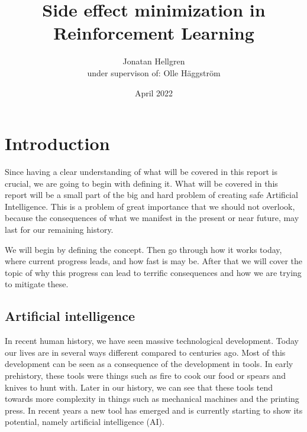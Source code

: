 \documentclass[12pt,A4]{report}
\title{Side effect minimization in Reinforcement Learning}
\author{Jonatan Hellgren\\
under supervison of: Olle Häggström}
\date{April 2022}
\theoremstyle{definition}
\begin{document}
\maketitle


\thispagestyle{empty}

\newpage
{}

\tableofcontents

\newpage
{}

% 

\chapter{Introduction}
Since having a clear understanding of what will be covered in this report is crucial, we are going to begin with defining it. What will be covered in this report will be a small part of the big and hard problem of creating safe Artificial Intelligence. This is a problem of great importance that we should not overlook, because the consequences of what we manifest in the present or near future, may last for our remaining history. 

We will begin by defining the concept. Then go through how it works today, where current progress leads, and how fast is may be. After that we will cover the topic of why this progress can lead to terrific consequences and how we are trying to mitigate these.


\section{Artificial intelligence}

In recent human history, we have seen massive technological development. Today our lives are in several ways different compared to centuries ago. Most of this development can be seen as a consequence of the development in tools. In early prehistory, these tools were things such as fire to cook our food or spears and knives to hunt with. Later in our history, we can see that these tools tend towards more complexity in things such as mechanical machines and the printing press. In recent years a new tool has emerged and is currently starting to show its potential, namely artificial intelligence (AI). 
\end{document}

